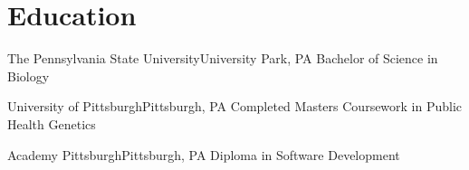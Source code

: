 
\section{Education}
\resumeSubHeadingListStart
  \resumeSubheading
    {The Pennsylvania State University}{University Park, PA}
    {Bachelor of Science in Biology}{}

  \resumeSubheading
    {University of Pittsburgh}{Pittsburgh, PA}
    {Completed Masters Coursework in Public Health Genetics}{}

  \resumeSubheading
    {Academy Pittsburgh}{Pittsburgh, PA}
    {Diploma in Software Development}{}
\resumeSubHeadingListEnd